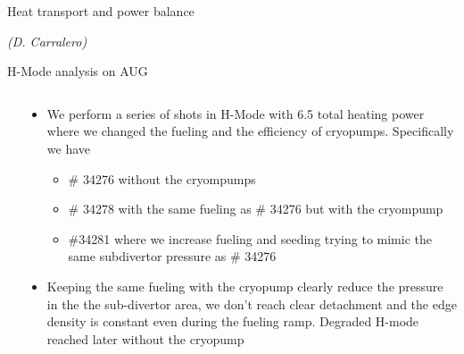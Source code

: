 \documentclass[10pt, compress]{beamer}
\newcommand\Fontvi{\fontsize{9}{8.2}\selectfont}
\begin{document}
\begin{frame}{Heat transport and power balance}
{\begin{flushleft}
{\small \textit{(D. Carralero)}}
  \end{flushleft}
}
\end{frame}
\begin{frame}{H-Mode analysis on AUG}
    \Fontvi
  \vspace{-1cm}
  \begin{columns}
  \begin{column}{0.55\textwidth}
  \end{column}
  \begin{column}{0.45\textwidth}
    \begin{itemize}
    \item<1|only@1> We perform a series of shots in H-Mode with 6.5
      total heating power where we changed the fueling and the
      efficiency of cryopumps. Specifically we have
      \begin{itemize}
        \item<1|only@1>\textcolor{colorA}{\# 34276 without the
            cryompumps}
        \item<1|only@1> \textcolor{colorB}{\# 34278 with the same
            fueling as} \textcolor{colorA}{\# 34276} \textcolor{colorB}{but with the cryompump}
        \item<1|only@1> \textcolor{colorC}{\#34281 where we increase
            fueling and seeding trying to mimic the same subdivertor
            pressure as} \textcolor{colorA}{\# 34276}
      \end{itemize}
    \item<1|only@1> Keeping the same fueling with the cryopump clearly
      reduce the pressure in the the sub-divertor area, we don't reach
      clear detachment and the edge density is constant even during
      the fueling ramp. Degraded H-mode reached later without the cryopump
      

\end{itemize}
\end{column}
\end{columns}
\end{frame}
\end{document}
